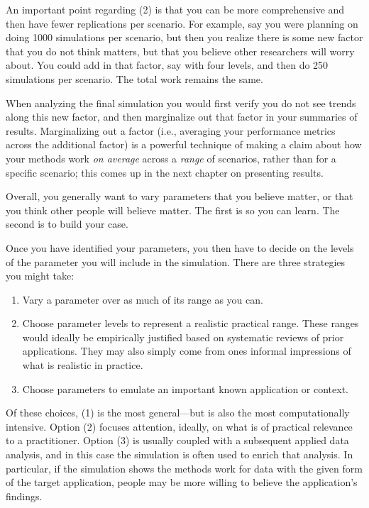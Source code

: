 \documentclass[
]{book}
\providecommand{\tightlist}{%
  \setlength{\itemsep}{0pt}\setlength{\parskip}{0pt}}
\begin{document}
An important point regarding (2) is that you can be more comprehensive and then have fewer replications per scenario.
For example, say you were planning on doing 1000 simulations per scenario, but then you realize there is some new factor that you do not think matters, but that you believe other researchers will worry about.
You could add in that factor, say with four levels, and then do 250 simulations per scenario.
The total work remains the same.

When analyzing the final simulation you would first verify you do not see trends along this new factor, and then marginalize out that factor in your summaries of results.
Marginalizing out a factor (i.e., averaging your performance metrics across the additional factor) is a powerful technique of making a claim about how your methods work \emph{on average} across a \emph{range} of scenarios, rather than for a specific scenario; this comes up in the next chapter on presenting results.

Overall, you generally want to vary parameters that you believe matter, or that you think other people will believe matter.
The first is so you can learn.
The second is to build your case.

Once you have identified your parameters, you then have to decide on the levels of the parameter you will include in the simulation.
There are three strategies you might take:

\begin{enumerate}
\def\labelenumi{\arabic{enumi}.}
\tightlist
\item
  Vary a parameter over as much of its range as you can.
\item
  Choose parameter levels to represent a realistic practical range. These ranges would ideally be empirically justified based on systematic reviews of prior applications. They may also simply come from ones informal impressions of what is realistic in practice.
\item
  Choose parameters to emulate an important known application or context.
\end{enumerate}

Of these choices, (1) is the most general---but is also the most computationally intensive.
Option (2) focuses attention, ideally, on what is of practical relevance to a practitioner.
Option (3) is usually coupled with a subsequent applied data analysis, and in this case the simulation is often used to enrich that analysis.
In particular, if the simulation shows the methods work for data with the given form of the target application, people may be more willing to believe the application's findings.
\end{document}
